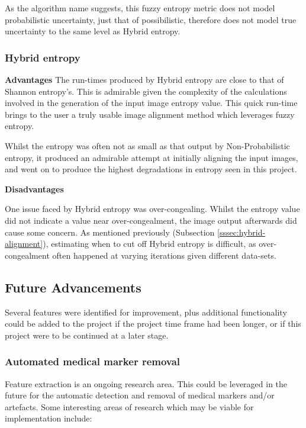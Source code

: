 As the algorithm name suggests, this fuzzy entropy metric does not model probabilistic uncertainty, just that of possibilistic, therefore does not model true uncertainty to the same level as Hybrid entropy.

\subsubsection{Hybrid entropy}

\noindent \textbf{Advantages}
The run-times produced by Hybrid entropy are close to that of Shannon entropy's. This is admirable given the complexity of the calculations involved in the generation of the input image entropy value. This quick run-time brings to the user a truly usable image alignment method which leverages fuzzy entropy.

Whilst the entropy was often not as small as that output by Non-Probabilistic entropy, it produced an admirable attempt at initially aligning the input images, and went on to produce the highest degradations in entropy seen in this project.

\noindent \textbf{Disadvantages}

One issue faced by Hybrid entropy was over-congealing. Whilst the entropy value did not indicate a value near over-congealment, the image output afterwards did cause some concern. As mentioned previously (Subsection \ref{sssec:hybrid-alignment}), estimating when to cut off Hybrid entropy is difficult, as over-congealment often happened at varying iterations given different data-sets.

\subsection{Future Advancements}
\label{ssec:improvements}

Several features were identified for improvement, plus additional functionality could be added to the project if the project time frame had been longer, or if this project were to be continued at a later stage.

\subsubsection{Automated medical marker removal}
Feature extraction is an ongoing research area. This could be leveraged in the future for the automatic detection and removal of medical markers and/or artefacts. Some interesting areas of research which may be viable for implementation include:

